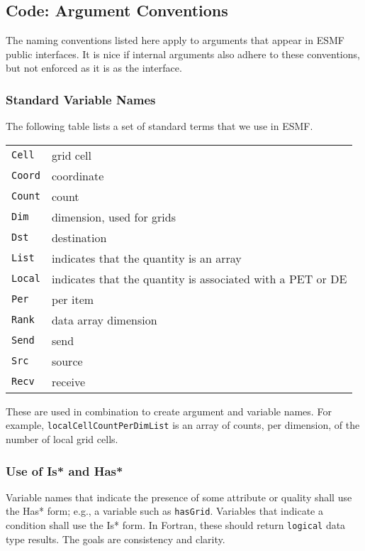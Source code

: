 \subsection{Code: Argument Conventions}

The naming conventions listed here apply to arguments that appear in 
ESMF public interfaces.  It is nice if internal arguments also adhere
to these conventions, but not enforced as it is as the interface.

\subsubsection{Standard Variable Names}

The following table lists a set of standard terms that we use in ESMF.

\begin{tabular}{ll}
{\tt Cell} & grid cell \\
{\tt Coord} & coordinate \\
{\tt Count} & count \\
{\tt Dim} & dimension, used for grids \\
{\tt Dst} & destination \\
{\tt List} & indicates that the quantity is an array \\
{\tt Local} & indicates that the quantity is associated with a PET or DE \\
{\tt Per} & per item \\
{\tt Rank} & data array dimension \\
{\tt Send} & send \\
{\tt Src} & source \\
{\tt Recv} & receive \\
\end{tabular}


These are used in combination to create argument and variable names.  
For example, {\tt localCellCountPerDimList} is an array of counts, per 
dimension, of the number of local grid cells.

\subsubsection{Use of Is* and Has*} Variable names that indicate the 
presence of some attribute or quality shall use the Has* form; e.g., a 
variable such as {\tt hasGrid}.  Variables that indicate a condition shall 
use the Is* form.  In Fortran, these should return {\tt logical}
data type results.  The goals are consistency and clarity.

